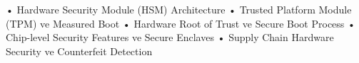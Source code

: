 • Hardware Security Module (HSM) Architecture
• Trusted Platform Module (TPM) ve Measured Boot
• Hardware Root of Trust ve Secure Boot Process
• Chip-level Security Features ve Secure Enclaves
• Supply Chain Hardware Security ve Counterfeit Detection